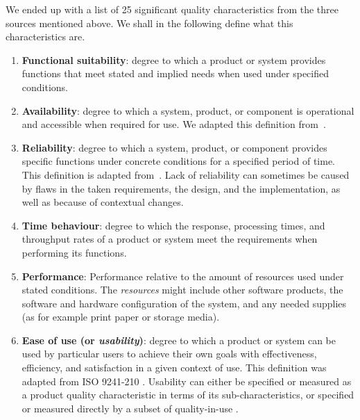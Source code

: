 We ended up with a list of 25 significant quality characteristics from the three sources mentioned above. We shall in the following define what this characteristics are.

\begin{enumerate}
    \item \textbf{Functional suitability}: degree to which a product or system provides functions that meet stated and implied needs when used under specified conditions.

    \item \textbf{Availability}: degree to which a system, product, or component is operational and accessible when required for use. We adapted this definition from~\cite{iso_central_secretary_isoiecieee_2010}.

    \item \textbf{Reliability}: degree to which a system, product, or component provides specific functions under concrete conditions for a specified period of time. This definition is adapted from~\cite{iso_central_secretary_isoiecieee_2010}. Lack of reliability can sometimes be caused by flaws in the taken requirements, the design, and the implementation, as well as because of contextual changes.  

    \item \textbf{Time behaviour}: degree to which the response, processing times, and throughput rates of a product or system meet the requirements when performing its functions.

    \item \textbf{Performance}: Performance relative to the amount of resources used under stated conditions. The \textit{resources} might include other software products, the software and hardware configuration of the system, and any needed supplies (as for example print paper or storage media).

    \item \textbf{Ease of use (or \textit{usability})}: degree to which a product or system can be used by particular users to achieve their own goals with effectiveness, efficiency, and satisfaction in a given context of use. This definition was adapted from ISO 9241-210 . Usability can either be specified or measured as a product quality characteristic in terms of its sub-characteristics, or specified or measured directly by a subset of quality-in-use .


\end{enumerate}
